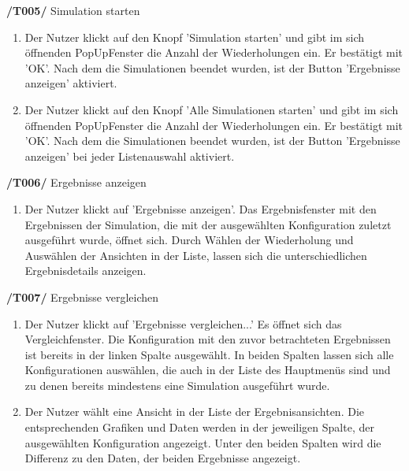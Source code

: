 \textbf{/T005/} Simulation starten
\begin{enumerate}
\item {}
{Der Nutzer klickt auf den Knopf 'Simulation starten' und gibt im sich öffnenden PopUpFenster die Anzahl der Wiederholungen ein. Er bestätigt mit 'OK'.}
{Nach dem die Simulationen beendet wurden, ist der Button 'Ergebnisse anzeigen' aktiviert.}

\item {}
{Der Nutzer klickt auf den Knopf 'Alle Simulationen starten' und gibt im sich öffnenden PopUpFenster die Anzahl der Wiederholungen ein. Er bestätigt mit 'OK'.}
{Nach dem die Simulationen beendet wurden, ist der Button 'Ergebnisse anzeigen' bei jeder Listenauswahl aktiviert.}


\end{enumerate}

\textbf{/T006/} Ergebnisse anzeigen
\begin{enumerate}
\item {}
{Der Nutzer klickt auf 'Ergebnisse anzeigen'.}
{Das Ergebnisfenster mit den Ergebnissen der Simulation, die mit der ausgewählten Konfiguration zuletzt ausgeführt wurde, öffnet sich. Durch Wählen der Wiederholung und Auswählen der Ansichten in der Liste, lassen sich die unterschiedlichen Ergebnisdetails anzeigen.}


\end{enumerate}

\textbf{/T007/} Ergebnisse vergleichen
\begin{enumerate}
\item {}
{Der Nutzer klickt auf 'Ergebnisse vergleichen...'}
{Es öffnet sich das Vergleichfenster. Die Konfiguration mit den zuvor betrachteten Ergebnissen ist bereits in der linken Spalte ausgewählt. In beiden Spalten lassen sich alle Konfigurationen auswählen, die auch in der Liste des Hauptmenüs sind und zu denen bereits mindestens eine Simulation ausgeführt wurde.}

\item {}
{Der Nutzer wählt eine Ansicht in der Liste der Ergebnisansichten.}
{Die entsprechenden Grafiken und Daten werden in der jeweiligen Spalte, der ausgewählten Konfiguration angezeigt. Unter den beiden Spalten wird die Differenz zu den Daten, der beiden Ergebnisse angezeigt.}


\end{enumerate}

